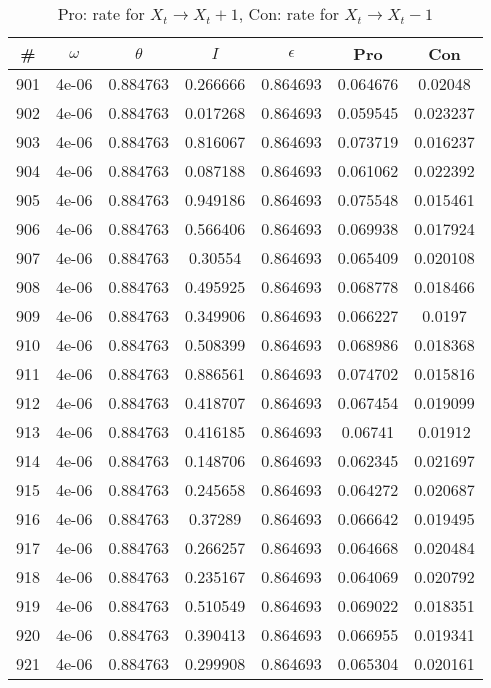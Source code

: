 \newpage
\begin{table}
\caption{Pro: rate for $X_t \rightarrow X_t + 1$, Con: rate for $X_t \rightarrow X_t - 1$}
\begin{tabular*}{\linewidth}{c|c|c|c|c|c|c}
\# & $\omega$ & $\theta$ & $I$ & $\epsilon$ & Pro & Con \\
\hline
901 & 4e-06 & 0.884763 & 0.266666 & 0.864693 & 0.064676 & 0.02048\\
902 & 4e-06 & 0.884763 & 0.017268 & 0.864693 & 0.059545 & 0.023237\\
903 & 4e-06 & 0.884763 & 0.816067 & 0.864693 & 0.073719 & 0.016237\\
904 & 4e-06 & 0.884763 & 0.087188 & 0.864693 & 0.061062 & 0.022392\\
905 & 4e-06 & 0.884763 & 0.949186 & 0.864693 & 0.075548 & 0.015461\\
906 & 4e-06 & 0.884763 & 0.566406 & 0.864693 & 0.069938 & 0.017924\\
907 & 4e-06 & 0.884763 & 0.30554 & 0.864693 & 0.065409 & 0.020108\\
908 & 4e-06 & 0.884763 & 0.495925 & 0.864693 & 0.068778 & 0.018466\\
909 & 4e-06 & 0.884763 & 0.349906 & 0.864693 & 0.066227 & 0.0197\\
910 & 4e-06 & 0.884763 & 0.508399 & 0.864693 & 0.068986 & 0.018368\\
911 & 4e-06 & 0.884763 & 0.886561 & 0.864693 & 0.074702 & 0.015816\\
912 & 4e-06 & 0.884763 & 0.418707 & 0.864693 & 0.067454 & 0.019099\\
913 & 4e-06 & 0.884763 & 0.416185 & 0.864693 & 0.06741 & 0.01912\\
914 & 4e-06 & 0.884763 & 0.148706 & 0.864693 & 0.062345 & 0.021697\\
915 & 4e-06 & 0.884763 & 0.245658 & 0.864693 & 0.064272 & 0.020687\\
916 & 4e-06 & 0.884763 & 0.37289 & 0.864693 & 0.066642 & 0.019495\\
917 & 4e-06 & 0.884763 & 0.266257 & 0.864693 & 0.064668 & 0.020484\\
918 & 4e-06 & 0.884763 & 0.235167 & 0.864693 & 0.064069 & 0.020792\\
919 & 4e-06 & 0.884763 & 0.510549 & 0.864693 & 0.069022 & 0.018351\\
920 & 4e-06 & 0.884763 & 0.390413 & 0.864693 & 0.066955 & 0.019341\\
921 & 4e-06 & 0.884763 & 0.299908 & 0.864693 & 0.065304 & 0.020161\\

\end{tabular*}
\end{table}
